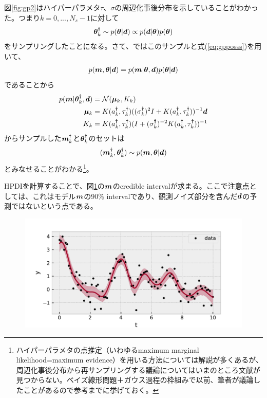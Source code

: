 図\ref{fig:gp2}はハイパーパラメタ$\tau$、$\sigma$の周辺化事後分布を示していることがわかった。つまり$k=0,..., N_s-1$に対して
\begin{align}
\label{eq:gmposts}
\boldsymbol{\theta}^\dagger_k \sim p(\boldsymbol{\theta}|\boldsymbol{d}) \propto p(\boldsymbol{d}|\boldsymbol{\theta}) p(\boldsymbol{\theta})
\end{align}
をサンプリングしたことになる。さて、ではこのサンプルと式(\ref{eq:gpposss})を用いて、
\begin{align}
\label{eq:gpposssaq}
p(\boldsymbol{m}, \boldsymbol{\theta}|\boldsymbol{d}) = p(\boldsymbol{m}|\boldsymbol{\theta}, \boldsymbol{d}) p(\boldsymbol{\theta}|\boldsymbol{d})
\end{align}
であることから
\begin{align}
\label{eq:gpposssaahuq}
 p(\boldsymbol{m}|\boldsymbol{\theta}^\dagger_k, \boldsymbol{d}) &= \mathcal{N} ( \boldsymbol{\mu}_k ,  K_k ) \\
 \label{eq:muvk}
 \boldsymbol{\mu}_k &= K(a^\dagger_k,\tau^\dagger_k) ((\sigma^\dagger_k)^{2} I + K(a^\dagger_k,\tau^\dagger_k) )^{-1} \boldsymbol{d} \\
  \label{eq:Kk}
 K_k &= K(a^\dagger_k,\tau^\dagger_k)(I + (\sigma^\dagger_k)^{-2} K(a^\dagger_k,\tau^\dagger_k) )^{-1} 
\end{align}
からサンプルした$\boldsymbol{m}^\dagger_k$と$\boldsymbol{\theta}^\dagger_k$のセットは
\begin{align}
\label{eq:gpposssaqp}
(\boldsymbol{m}^\dagger_k,\boldsymbol{\theta}^\dagger_k) \sim p(\boldsymbol{m}, \boldsymbol{\theta}|\boldsymbol{d}) 
\end{align}
とみなせることがわかる\footnote{ハイパーパラメタの点推定（いわゆるmaximum marginal likelihood=maximum evidence）を用いる方法については解説が多くあるが、周辺化事後分布から再サンプリングする議論についてはいまのところ文献が見つからない。ベイズ線形問題＋ガウス過程の枠組みで以前、筆者が議論したことがあるので参考までに挙げておく\cite{2020ApJ...900...48K}。}。

HPDIを計算することで、図\ref{fig:gp4}の$\boldsymbol{m}$のcredible intervalが求まる。ここで注意点としては、これはモデル$\boldsymbol{m}$の90\% intervalであり、観測ノイズ部分を含んだ$\boldsymbol{d}$の予測ではないという点である。
\begin{figure}[htb]
\begin{center}
\includegraphics[width=\linewidth]{fig/gp/gp4.pdf}
\caption{\label{fig:gp4}}
\end{center}
\end{figure}

